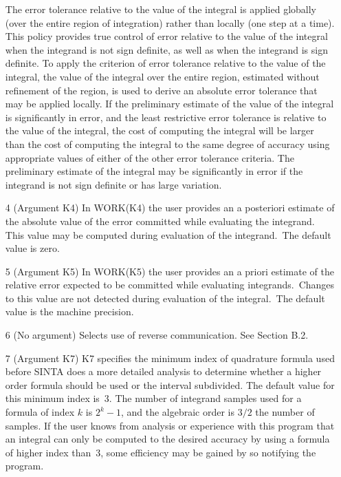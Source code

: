 \documentclass[twoside]{MATH77}
\begin{document}
\begin{itemize}
The error tolerance relative to the value of the integral is applied
globally (over the entire region of integration) rather than locally (one
step at a time). This policy provides true control of error relative to the
value of the integral when the integrand is not sign definite, as well as
when the integrand is sign definite. To apply the criterion of error
tolerance relative to the value of the integral, the value of the integral
over the entire region, estimated without refinement of the region, is used
to derive an absolute error tolerance that may be applied locally. If the
preliminary estimate of the value of the integral is significantly in error,
and the least restrictive error tolerance is relative to the value of the
integral, the cost of computing the integral will be larger than the cost of
computing the integral to the same degree of accuracy using appropriate
values of either of the other error tolerance criteria. The preliminary
estimate of the integral may be significantly in error if the integrand is
not sign definite or has large variation.

\item[4]  (Argument K4) In WORK(K4) the user provides an a posteriori
estimate of the absolute value of the error committed while evaluating the
integrand. This value may be computed during evaluation of the integrand.\
The default value is zero.

\item[5]  (Argument K5) In WORK(K5) the user provides an a priori estimate
of the relative error expected to be committed while evaluating integrands.\
Changes to this value are not detected during evaluation of the integral.\
The default value is the machine precision.

\item[6]  (No argument) Selects use of reverse communication. See Section
B.2.

\item[7]  (Argument K7) K7 specifies the minimum index of quadrature formula
used before SINTA does a more detailed analysis to determine whether a
higher order formula should be used or the interval subdivided. The default
value for this minimum index is~3. The number of integrand samples used for
a formula of index $k$ is $2^k-1$, and the algebraic order is $3/2$ the
number of samples. If the user knows from analysis or experience with this
program that an integral can only be computed to the desired accuracy by
using a formula of higher index than~3, some efficiency may be gained by so
notifying the program.


\end{itemize}
\end{document}
